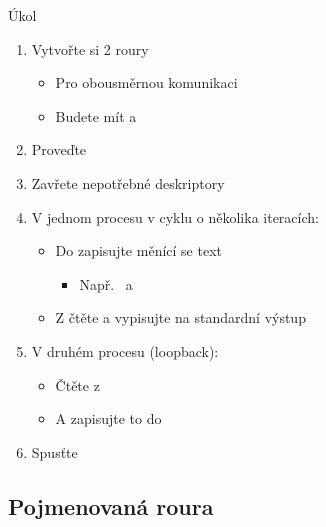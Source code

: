 \begin{frame}{Úkol}

  \begin{enumerate}
    \item Vytvořte si 2 roury
    \begin{itemize}
      \item Pro obousměrnou komunikaci
      \item Budete mít  a 
    \end{itemize}
    \item Proveďte 
    \item Zavřete nepotřebné deskriptory

    \item V jednom procesu v cyklu o několika iteracích:
    \begin{itemize}
      \item Do  zapisujte měnící se text
      \begin{itemize}
	\item Např.\  a 
      \end{itemize}
      \item Z  čtěte a vypisujte na standardní výstup
    \end{itemize}

    \item V druhém procesu (loopback):
    \begin{itemize}
      \item Čtěte z 
      \item A zapisujte to do 
    \end{itemize}

    \item Spusťte
  \end{enumerate}

\end{frame}

\iffimuni
\subsection{Pojmenovaná roura}
\fi

